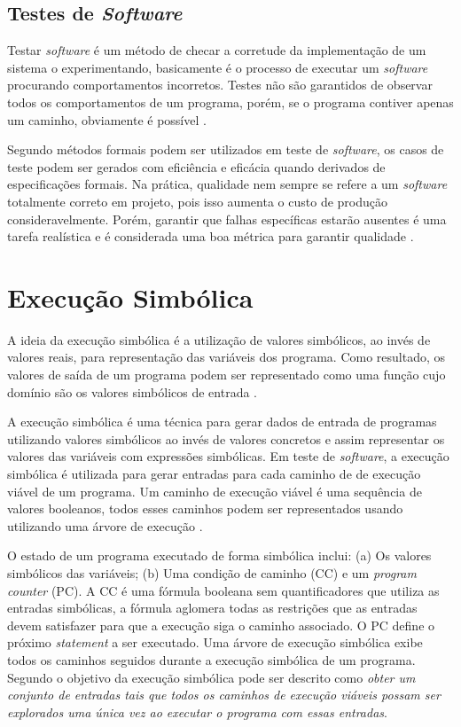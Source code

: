 \subsection{Testes de \textit{Software}}
Testar \textit{software} é um método de checar a corretude da implementação de um sistema o experimentando, basicamente é o processo de executar um \textit{software} procurando  comportamentos incorretos. Testes não são garantidos de observar todos os comportamentos de um programa, porém, se o programa contiver apenas um caminho, obviamente é possível \cite{ding:2008}.
\par
Segundo  métodos formais podem ser utilizados em teste de \textit{software}, os casos de teste podem ser gerados com eficiência e eficácia quando derivados de especificações formais. Na prática, qualidade nem sempre se refere a um \textit{software} totalmente correto em projeto, pois isso aumenta o custo de produção consideravelmente. Porém, garantir que falhas específicas estarão ausentes é uma tarefa realística e é considerada uma boa métrica para garantir qualidade \cite{dsilva:2008}.

\section{Execução Simbólica}
\label{sec:exec_simb}
A ideia da execução simbólica é a utilização de valores simbólicos, ao invés de valores reais, para representação das variáveis dos programa. Como resultado, os valores de saída de um programa podem ser representado como uma função cujo domínio são os valores simbólicos de entrada \cite{Khurshid:2003}.
\par
A execução simbólica é uma técnica para gerar dados de entrada de programas utilizando valores simbólicos ao invés de valores concretos e assim representar os valores das variáveis com expressões simbólicas. Em teste de \textit{software}, a execução simbólica é utilizada para gerar entradas para cada caminho de de execução viável de um programa. Um caminho de execução viável é uma sequência de valores booleanos, todos esses caminhos podem ser representados usando utilizando uma árvore de execução \cite{Cadar:2013}.
\par
O estado de um programa executado de forma simbólica inclui: (a) Os valores simbólicos das variáveis; (b) Uma condição de caminho (CC) e um \textit{program counter} (PC). A CC é uma fórmula booleana sem quantificadores que utiliza as entradas simbólicas, a fórmula aglomera todas as restrições que as entradas devem satisfazer para que a execução siga o caminho associado. O PC define o próximo \textit{statement} a ser executado. Uma árvore de execução simbólica exibe todos os caminhos seguidos durante a execução simbólica de um programa. Segundo  o objetivo da execução simbólica pode ser descrito como \textit{obter um conjunto de entradas tais que todos os caminhos de execução viáveis possam ser explorados uma única vez ao executar o programa com essas entradas}. 

